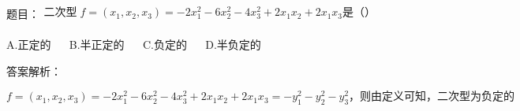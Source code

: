 

题目：$\begin{array}{l}\mathrm{二次型}\;f=(x_1,x_2,x_3)=-2x_1^2-6x_2^2-4x_3^2+2x_1x_2+2x_1x_3是（）\\\end{array}$

A.$\mathrm{正定的}$ $\quad$ B.$\mathrm{半正定的}$ $\quad$ C.$\mathrm{负定的}$ $\quad$ D.$\mathrm{半负定的}$

答案解析：

$f=(x_1,x_2,x_3)=-2x_1^2-6x_2^2-4x_3^2+2x_1x_2+2x_1x_3=-y_1^2-y_2^2-y_3^2，\mathrm{则由定义可知}，\mathrm{二次型为负定的}$




